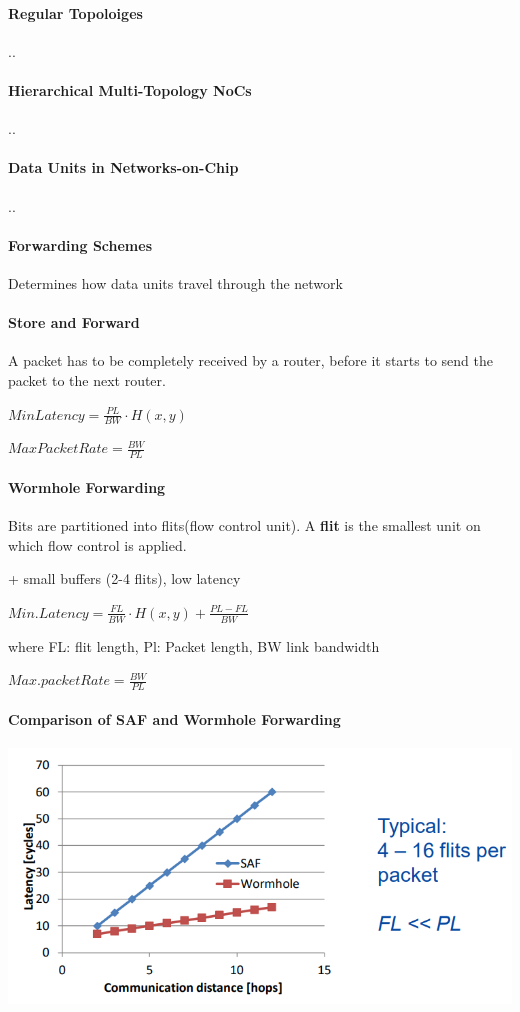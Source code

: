 \documentclass[fontsize=8pt]{scrartcl}
\newcommand{\coloreq}[1]{\colorbox{nordicRed}{\(\displaystyle #1\)}}
\begin{document}
\begin{multicols*}{4}
\paragraph{Regular Topoloiges}..

\paragraph{Hierarchical Multi-Topology NoCs}..

\paragraph{Data Units in Networks-on-Chip}..

\paragraph{Forwarding Schemes} Determines how data units travel through the network

\paragraph{Store and Forward} A packet has to be completely received by a router, before it starts to send the packet to the next router.

\coloreq{MinLatency = \frac{PL}{BW} \cdot H(x, y)}

\coloreq{MaxPacketRate = \frac{BW}{PL}}

\paragraph{Wormhole Forwarding} Bits are partitioned into flits(flow control unit). A \textbf{flit} is the smallest unit on which flow control is applied.

+ small buffers (2-4 flits), low latency

\coloreq{Min.Latency = \frac{FL}{BW} \cdot H(x,y) + \frac{PL - FL}{BW}}

where FL: flit length, Pl: Packet length, BW link bandwidth

\coloreq{Max.packetRate = \frac{BW}{PL}}

\paragraph{Comparison of SAF and Wormhole Forwarding}

\begin{center}
  \includegraphics[width=0.8\linewidth]{img/cmpSAFWormhole.png}
  \label{fig:cmpsafwormhole}
\end{center}


\end{multicols*}
\end{document}
